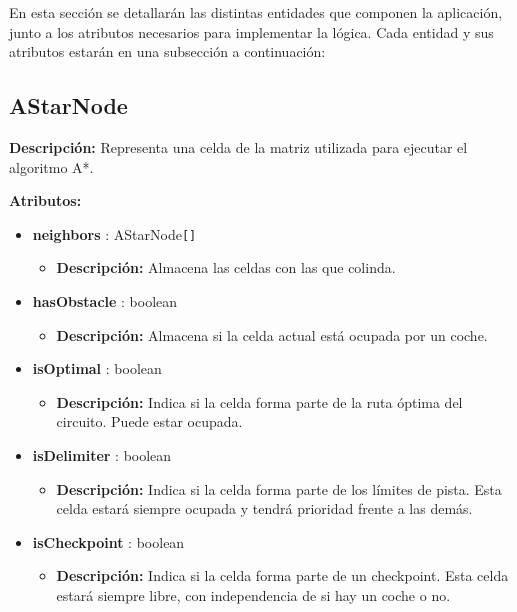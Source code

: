 En esta sección se detallarán las distintas entidades que componen la aplicación, junto a los atributos necesarios para implementar la lógica. Cada entidad y sus atributos estarán en una subsección a continuación:

\subsection{AStarNode}
\textbf{Descripción: }Representa una celda de la matriz utilizada para ejecutar el algoritmo A*.

\bigskip

\textbf{Atributos: }
\begin{itemize}
    \item \textbf{neighbors} : AStarNode\verb|[]|
    \begin{itemize}
        \item \textbf{Descripción: }Almacena las celdas con las que colinda.
    \end{itemize}

    \item \textbf{hasObstacle} : boolean
    \begin{itemize}
        \item \textbf{Descripción: }Almacena si la celda actual está ocupada por un coche.
    \end{itemize}

    \item \textbf{isOptimal} : boolean
    \begin{itemize}
        \item \textbf{Descripción: }Indica si la celda forma parte de la ruta óptima del circuito. Puede estar ocupada.
    \end{itemize}

    \item \textbf{isDelimiter} : boolean
    \begin{itemize}
        \item \textbf{Descripción: }Indica si la celda forma parte de los límites de pista. Esta celda estará siempre ocupada y tendrá prioridad frente a las demás.
    \end{itemize}

    \item \textbf{isCheckpoint} : boolean
    \begin{itemize}
        \item \textbf{Descripción: }Indica si la celda forma parte de un checkpoint. Esta celda estará siempre libre, con independencia de si hay un coche o no.
    \end{itemize}
\end{itemize}
